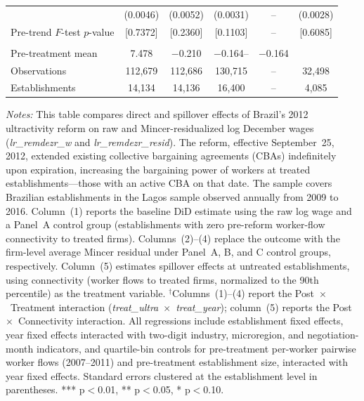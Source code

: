 \documentclass[12pt,letterpaper]{article}
\begin{document}
\begin{table}[]
\begin{threeparttable}
\begin{tabular}{lccccc}
  & (0.0046) & (0.0052) & (0.0031) & -- & (0.0028) \\
Pre-trend $F$-test $p$-value & [0.7372] & [0.2360] & [0.1103] & -- & [0.6085] \\
  &  &  &  &  & \\
Pre-treatment mean & 7.478 & $-$0.210 & $-$0.164-- & $-$0.164 \\
Observations & 112{,}679 & 112{,}686 & 130{,}715 & -- & 32{,}498 \\
Establishments & 14{,}134 & 14{,}136 & 16{,}400 & -- & 4{,}085 \\
\bottomrule
\end{tabular}
\scriptsize
\begin{tablenotes}
\item \textit{Notes:} This table compares direct and spillover effects of Brazil's 2012 ultractivity reform on raw and Mincer-residualized log December wages (\textit{lr\_remdezr\_w} and \textit{lr\_remdezr\_resid}). The reform, effective September~25, 2012, extended existing collective bargaining agreements (CBAs) indefinitely upon expiration, increasing the bargaining power of workers at treated establishments---those with an active CBA on that date. The sample covers Brazilian establishments in the Lagos sample observed annually from 2009 to 2016. Column~(1) reports the baseline DiD estimate using the raw log wage and a Panel~A control group (establishments with zero pre-reform worker-flow connectivity to treated firms). Columns~(2)--(4) replace the outcome with the firm-level average Mincer residual under Panel~A, B, and C control groups, respectively. Column~(5) estimates spillover effects at untreated establishments, using connectivity (worker flows to treated firms, normalized to the 90th percentile) as the treatment variable. $^\dagger$Columns~(1)--(4) report the Post~$\times$~Treatment interaction (\textit{treat\_ultra}~$\times$~\textit{treat\_year}); column~(5) reports the Post~$\times$~Connectivity interaction. All regressions include establishment fixed effects, year fixed effects interacted with two-digit industry, microregion, and negotiation-month indicators, and quartile-bin controls for pre-treatment per-worker pairwise worker flows (2007--2011) and pre-treatment establishment size, interacted with year fixed effects. Standard errors clustered at the establishment level in parentheses. *** p$<$0.01, ** p$<$0.05, * p$<$0.10.
\end{tablenotes}
\end{threeparttable}
\end{table}
\end{document}
